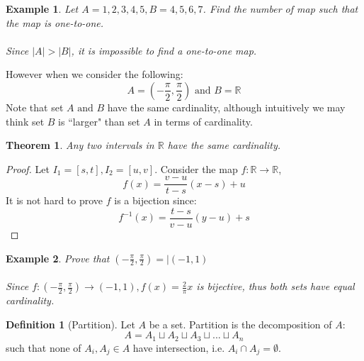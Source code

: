 \documentclass{article}
\theoremstyle{MyNonumberplain}
\theoremstyle{break}
\newtheorem*{proof}{Proof. }
\newcommand{\R}{\mathbb{R}}
\theoremstyle{break}
\newtheorem{theorem}{Theorem}[section]
\newtheorem{example}{Example}[section]
\theoremstyle{break}
\theoremstyle{definition}
\theoremstyle{break}
\newtheorem{definition}{Definition}[section]
\begin{document}
\begin{expbox}
    \begin{example}
        Let $A={1,2,3,4,5},B={4,5,6,7}$. Find the number of map such that the map is one-to-one.\\\\
        Since $|A| > |B|$, it is impossible to find a one-to-one map.    
    \end{example}
\end{expbox}

However when we consider the following:
\[ A = \left( - \frac{\pi}{2}, \frac{\pi}{2} \right) \text{ and } B = \mathbb{R}
\]
Note that set $A \text{ and } B$ have the same cardinality, although intuitively we may think
set $B$ is ``larger" than set $A$ in terms of cardinality.

\begin{thmbox}
    \begin{theorem}
        Any two intervals in $\R$ have the same cardinality.
    \end{theorem}
    \begin{prfbox}
        \begin{proof}
            Let $I_1=[s,t], I_2=[u,v]$. Consider the map $f:\R\to\R$,
            $$f(x)=\frac{v-u}{t-s}(x-s)+u$$
        It is not hard to prove $f$ is a bijection since:
            $$f^{-1}(x)=\frac{t-s}{v-u}(y-u)+s$$
        \end{proof}
    \end{prfbox}
\end{thmbox}



\begin{expbox}
    \begin{example}
        Prove that $(-\frac{\pi}{2},\frac{\pi}{2})=|(-1,1)$\\\\
        Since $f:(-\frac{\pi}{2},\frac{\pi}{2})\to(-1,1),f(x)=\frac{2}{\pi}x$ is bijective, thus both sets have equal cardinality.
    \end{example}
\end{expbox}
\begin{defbox}
    \begin{definition}[Partition]
        Let $A$ be a set. Partition is the decomposition of $A$:
            $$A=A_1\sqcup A_2 \sqcup A_3 \sqcup ... \sqcup A_n$$
        such that none of $A_i,A_j\in A$ have intersection, i.e. $A_i\cap A_j=\emptyset$.
    \end{definition}  
\end{defbox}
\end{document}
